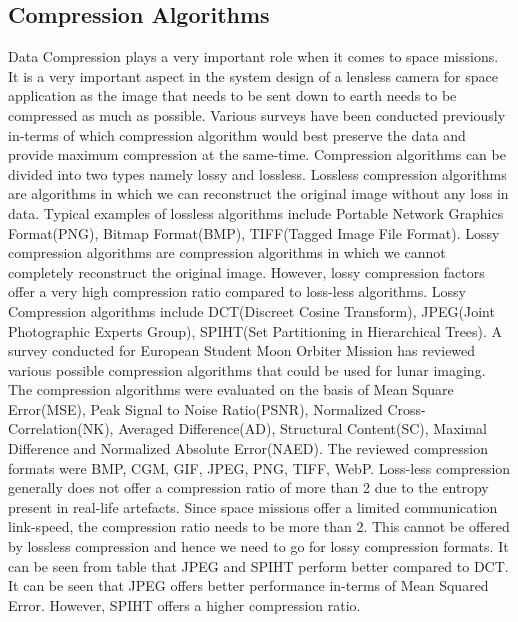 \subsection{Compression Algorithms}
Data Compression plays a very important role when it comes to space missions. It is a very important aspect in the system design of a lensless camera for space application as the image that needs to be sent down to earth needs to be compressed as much as possible. Various surveys\cite{Compression2}\cite{Compression3}\cite{Compression4} have been conducted previously in-terms of which compression algorithm would best preserve the data and provide maximum compression at the same-time. Compression algorithms can be divided into two types namely lossy and lossless. Lossless compression algorithms are algorithms in which we can reconstruct the original image without any loss in data. Typical examples of lossless algorithms include Portable Network Graphics Format(PNG), Bitmap Format(BMP), TIFF(Tagged Image File Format). Lossy compression algorithms are compression algorithms in which we cannot completely reconstruct the original image. However, lossy compression factors offer a very high compression ratio compared to loss-less algorithms. Lossy Compression algorithms include DCT(Discreet Cosine Transform), JPEG(Joint Photographic Experts Group), SPIHT(Set Partitioning in Hierarchical Trees)\cite{Compression3}. A survey conducted for European Student Moon Orbiter Mission\cite{Compression3} has reviewed various possible compression algorithms that could be used for lunar imaging. The compression algorithms were evaluated on the basis of Mean Square Error(MSE), Peak Signal to Noise Ratio(PSNR), Normalized Cross-Correlation(NK), Averaged Difference(AD), Structural Content(SC), Maximal Difference and Normalized Absolute Error(NAED). The reviewed compression formats were BMP, CGM, GIF, JPEG, PNG, TIFF, WebP. Loss-less compression generally does not offer a compression ratio of more than 2 due to the entropy present in real-life artefacts. Since space missions offer a limited communication link-speed, the compression ratio needs to be more than 2. This cannot be offered by lossless compression and hence we need to go for lossy compression formats. It can be seen from table \cite{tbl:TradeoffCompression} that JPEG and SPIHT perform better compared to DCT. It can be seen that JPEG offers better performance in-terms of Mean Squared Error. However, SPIHT offers a higher compression ratio. 

